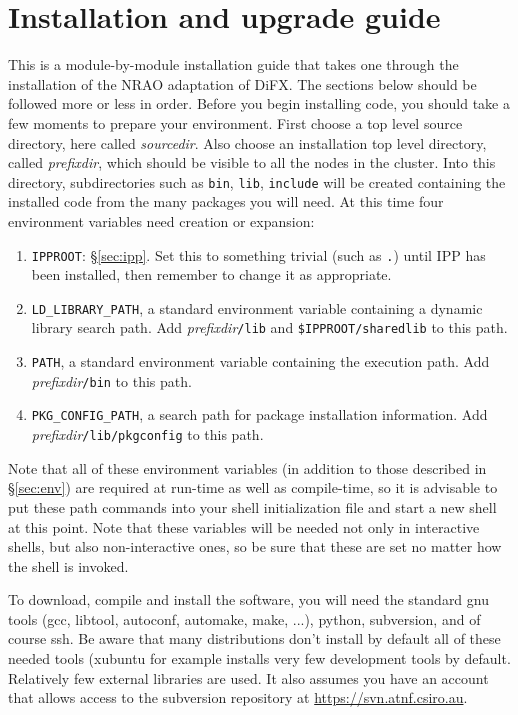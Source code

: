 


\section{Installation and upgrade guide} \label{sec:install}

This is a module-by-module installation guide that takes one through the installation of the NRAO adaptation of DiFX.
The sections below should be followed more or less in order.
Before you begin installing code, you should take a few moments to prepare your environment.
First choose a top level source directory, here called {\em sourcedir}.
Also choose an installation top level directory, called {\em prefixdir}, which should be visible to all the nodes in the cluster.  
Into this directory, subdirectories such as {\tt bin}, {\tt lib}, {\tt include} will be created containing the installed code from the many packages you will need.
At this time four environment variables need creation or expansion:
\begin{enumerate}
\item {\tt IPPROOT}: \S\ref{sec:ipp}.
Set this to something trivial (such as {\tt .}) until IPP has been installed, then remember to change it as appropriate.
\item {\tt LD\_LIBRARY\_PATH}, a standard environment variable containing a dynamic library search path.  
Add {\em prefixdir}{\tt /lib} and {\tt \$IPPROOT/sharedlib} to this path.
\item {\tt PATH}, a standard environment variable containing the execution path.
Add {\em prefixdir}{\tt /bin} to this path.
\item {\tt PKG\_CONFIG\_PATH}, a search path for package installation information.
Add {\em prefixdir}{\tt /lib/pkgconfig} to this path.
\end{enumerate}

Note that all of these environment variables (in addition to those described in \S\ref{sec:env}) are required at run-time as well as compile-time, so it is advisable to put these path commands into your shell initialization file and start a new shell at this point.
Note that these variables will be needed not only in interactive shells, but also non-interactive ones, so be sure that these are set no matter how the shell is invoked.

To download, compile and install the software, you will need the standard gnu tools (gcc, libtool, autoconf, automake, make, ...), python, subversion, and of course ssh.
Be aware that many distributions don't install by default all of these needed tools (xubuntu for example installs very few development tools by default.
Relatively few external libraries are used.
It also assumes you have an account that allows access to the subversion repository at \url{https://svn.atnf.csiro.au}.

